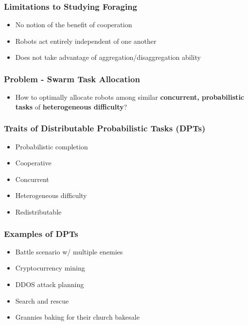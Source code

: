 \documentclass{beamer}
\theoremstyle{definition}
\begin{document}
\begin{frame}
    \frametitle{Limitations to Studying Foraging}

    \begin{itemize}
        \item No notion of the benefit of cooperation
        \item Robots act entirely independent of one another
        \item Does not take advantage of aggregation/disaggregation ability
    \end{itemize}
\end{frame}

\begin{frame}
    \frametitle{Problem - Swarm Task Allocation}

    \begin{itemize}
        \item How to optimally allocate robots among similar
            \textbf{concurrent, probabilistic tasks} of \textbf{heterogeneous difficulty}?
    \end{itemize}
\end{frame}

\begin{frame}
    \frametitle{Traits of Distributable Probabilistic Tasks (DPTs)}
    \begin{itemize}
        \item Probabilistic completion
        \item Cooperative
        \item Concurrent
        \item Heterogeneous difficulty
        \item Redistributable
    \end{itemize}
\end{frame}

\begin{frame}
    \frametitle{Examples of DPTs}

    \begin{itemize}
        \item Battle scenario w/ multiple enemies
        \item Cryptocurrency mining
        \item DDOS attack planning
        \item Search and rescue
        \item Grannies baking for their church bakesale
    \end{itemize}
\end{frame}
\end{document}
